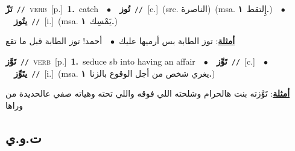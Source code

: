 \documentclass[10pt,a4paper,twoside]{article} %
\begin{document}
\begin{multicols}{2}
{\setlength\topsep{0pt}\textbf{\foreignlanguage{arabic}{تَزّ}}\ {\color{gray}\texttt{//}\color{black}}\ \textsc{verb}\ [p.]\ \textbf{1.}~catch\ \ $\bullet$\ \ \setlength\topsep{0pt}\textbf{\foreignlanguage{arabic}{تُوز}}\ {\color{gray}\texttt{//}\color{black}}\ [c.]\ (src. \color{gray}\foreignlanguage{arabic}{الناصرة}\color{black})\ \color{gray}(msa. \foreignlanguage{arabic}{إِلتقط}~\foreignlanguage{arabic}{\textbf{١.}})\color{black}\ \ $\bullet$\ \ \setlength\topsep{0pt}\textbf{\foreignlanguage{arabic}{يتُوز}}\ {\color{gray}\texttt{//}\color{black}}\ [i.]\ \color{gray}(msa. \foreignlanguage{arabic}{يَمْسِك}~\foreignlanguage{arabic}{\textbf{١.}})\color{black}\  \begin{flushright}\color{gray}\foreignlanguage{arabic}{\textbf{\underline{\foreignlanguage{arabic}{أمثلة}}}: توز الطابة بس أرميها عليك\ $\bullet$\ \  أحمد! توز الطابة قبل ما تقع}\end{flushright}\color{black}} \vspace{2mm}

{\setlength\topsep{0pt}\textbf{\foreignlanguage{arabic}{تَوَّز}}\ {\color{gray}\texttt{//}\color{black}}\ \textsc{verb}\ [p.]\ \textbf{1.}~seduce sb into having an affair\ \ $\bullet$\ \ \setlength\topsep{0pt}\textbf{\foreignlanguage{arabic}{تَوِّز}}\ {\color{gray}\texttt{//}\color{black}}\ [c.]\ \ $\bullet$\ \ \setlength\topsep{0pt}\textbf{\foreignlanguage{arabic}{يتَوِّز}}\ {\color{gray}\texttt{//}\color{black}}\ [i.]\ \color{gray}(msa. \foreignlanguage{arabic}{يغري شخص من أجل الوقوع بالزنا}~\foreignlanguage{arabic}{\textbf{١.}})\color{black}\  \begin{flushright}\color{gray}\foreignlanguage{arabic}{\textbf{\underline{\foreignlanguage{arabic}{أمثلة}}}: تَوَّزته بنت هالحرام وشلحته اللي فوقه واللي تحته وهياته صفي عالحديدة من وراها}\end{flushright}\color{black}} \vspace{2mm}

\vspace{-3mm}
\subsection*{\color{blue}\foreignlanguage{arabic}{ت.و.ي}\color{blue}{}} 


\end{multicols}
\end{document}
